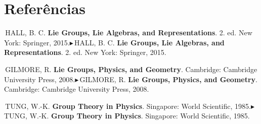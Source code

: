 \documentclass[12pt,a4paper]{article}   %
\newcommand{\nota}[1]{{\color{vermelho}%
  \ifmmode\blacktriangleright\,#1\else$\blacktriangleright$\,#1\fi}}
\begin{document}
\section*{Refer\^encias}   %
\begin{flushleft}
\setlength{\parindent}{0pt}

\nota{HALL, B. C. \textbf{Lie Groups, Lie Algebras, and
Representations}. 2. ed. New York: Springer, 2015.}

\vspace{4pt}
\nota{GILMORE, R. \textbf{Lie Groups, Physics, and Geometry}.
Cambridge: Cambridge University Press, 2008.}

\vspace{4pt}
\nota{TUNG, W.-K. \textbf{Group Theory in Physics}. Singapore: World
Scientific, 1985.}
\end{flushleft}
\end{document}
